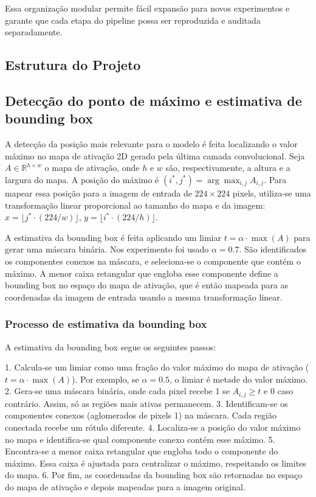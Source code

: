 \documentclass[%
 reprint,
 amsmath,amssymb,
 aps,
]{revtex4-2}
\begin{document}
Essa organização modular permite fácil expansão para novos experimentos e garante que cada etapa do pipeline possa ser reproduzida e auditada separadamente.

\subsection{Estrutura do Projeto}

\subsection{Detecção do ponto de máximo e estimativa de bounding box}

A detecção da posição mais relevante para o modelo é feita localizando o valor máximo no mapa de ativação 2D gerado pela última camada convolucional. Seja $A \in \mathbb{R}^{h \times w}$ o mapa de ativação, onde $h$ e $w$ são, respectivamente, a altura e a largura do mapa. A posição do máximo é $(i^*, j^*) = \arg\max_{i,j} A_{i,j}$. Para mapear essa posição para a imagem de entrada de $224\times224$ pixels, utiliza-se uma transformação linear proporcional ao tamanho do mapa e da imagem: $x = \lfloor j^* \cdot (224/w) \rfloor$, $y = \lfloor i^* \cdot (224/h) \rfloor$.

A estimativa da bounding box é feita aplicando um limiar $t = \alpha \cdot \max(A)$ para gerar uma máscara binária. Nos experimento foi usado $\alpha=0.7$. São identificados os componentes conexos na máscara, e seleciona-se o componente que contém o máximo. A menor caixa retangular que engloba esse componente define a bounding box no espaço do mapa de ativação, que é então mapeada para as coordenadas da imagem de entrada usando a mesma transformação linear.

\subsubsection{Processo de estimativa da bounding box}

A estimativa da bounding box segue os seguintes passos:

1. Calcula-se um limiar como uma fração do valor máximo do mapa de ativação ($t = \alpha \cdot \max(A)$). Por exemplo, se $\alpha=0.5$, o limiar é metade do valor máximo.
2. Gera-se uma máscara binária, onde cada pixel recebe 1 se $A_{i,j} \geq t$ e 0 caso contrário. Assim, só as regiões mais ativas permanecem.
3. Identificam-se os componentes conexos (aglomerados de pixels 1) na máscara. Cada região conectada recebe um rótulo diferente.
4. Localiza-se a posição do valor máximo no mapa e identifica-se qual componente conexo contém esse máximo.
5. Encontra-se a menor caixa retangular que engloba todo o componente do máximo. Essa caixa é ajustada para centralizar o máximo, respeitando os limites do mapa.
6. Por fim, as coordenadas da bounding box são retornadas no espaço do mapa de ativação e depois mapeadas para a imagem original.
\end{document}
